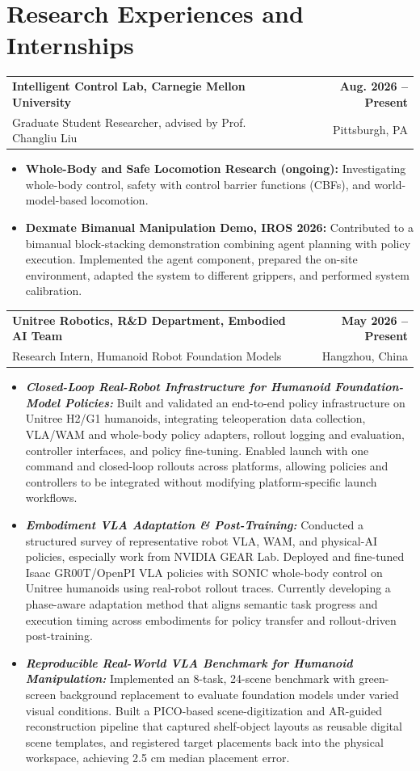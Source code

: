 \documentclass[11pt,letterpaper]{article}
\makeatletter
\newcommand{\resumeSubheading}[4]{
    \begin{tabularx}{\textwidth}{@{}Xr@{}}
        \textbf{#1} & \textbf{#2} \\
        #3 & #4 \\
    \end{tabularx}
}
\newcommand{\resumeItem}[1]{
    \item #1
}
\makeatother
\begin{document}
\section*{Research Experiences and Internships}
\resumeSubheading
{Intelligent Control Lab, Carnegie Mellon University}
{Aug. 2026 -- Present}
{\hspace*{1.4em}Graduate Student Researcher, advised by Prof. Changliu Liu}
{Pittsburgh, PA}
\begin{itemize}[leftmargin=2.4em, itemsep=0.5pt, topsep=0pt]
\small
\resumeItem{\textbf{Whole-Body and Safe Locomotion Research (ongoing):} Investigating whole-body control, safety with control barrier functions (CBFs), and world-model-based locomotion.}
\resumeItem{\textbf{Dexmate Bimanual Manipulation Demo, IROS 2026:} Contributed to a bimanual block-stacking demonstration combining agent planning with policy execution. Implemented the agent component, prepared the on-site environment, adapted the system to different grippers, and performed system calibration.}
\end{itemize}

\resumeSubheading
{ Unitree Robotics, R\&D Department, Embodied AI Team}
{May 2026 -- Present}
{\hspace*{1.4em}Research Intern, Humanoid Robot Foundation Models}
{Hangzhou, China}
\begin{itemize}[leftmargin=2.4em, itemsep=0.5pt, topsep=0pt]
    \small
    \resumeItem{\textbf{\textit{Closed-Loop Real-Robot Infrastructure for Humanoid Foundation-Model Policies:}} Built and validated an end-to-end policy infrastructure on Unitree H2/G1 humanoids, integrating teleoperation data collection, VLA/WAM and whole-body policy adapters, rollout logging and evaluation, controller interfaces, and policy fine-tuning. Enabled launch with one command and closed-loop rollouts across platforms, allowing policies and controllers to be integrated without modifying platform-specific launch workflows.}
    \resumeItem{\textbf{\textit{Embodiment VLA Adaptation \& Post-Training:}} Conducted a structured survey of representative robot VLA, WAM, and physical-AI policies, especially work from NVIDIA GEAR Lab. Deployed and fine-tuned Isaac GR00T/OpenPI VLA policies with SONIC whole-body control on Unitree humanoids using real-robot rollout traces. Currently developing a phase-aware adaptation method that aligns semantic task progress and execution timing across embodiments for policy transfer and rollout-driven post-training.}
    \resumeItem{\textbf{\textit{Reproducible Real-World VLA Benchmark for Humanoid Manipulation:}} Implemented an 8-task, 24-scene benchmark with green-screen background replacement to evaluate foundation models under varied visual conditions. Built a PICO-based scene-digitization and AR-guided reconstruction pipeline that captured shelf-object layouts as reusable digital scene templates, and registered target placements back into the physical workspace, achieving 2.5 cm median placement error.}
\end{itemize}
\end{document}

